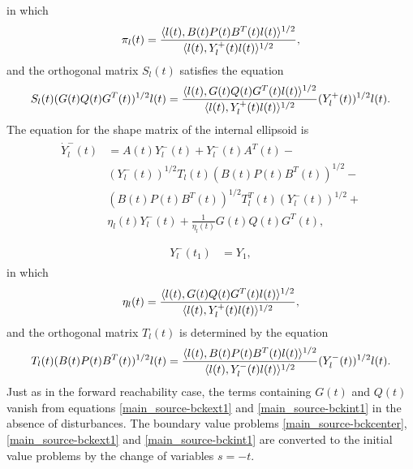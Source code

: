 \documentclass[letterpaper,10pt,english]{sphinxmanual}
\begin{document}
in which
\begin{gather}
\begin{split}\pi_l(t) = \frac{\langle l(t),
B(t)P(t)B^T(t)l(t)\rangle^{1/2}}{\langle l(t),
Y^+_l(t)l(t)\rangle^{1/2}},\end{split}\notag
\end{gather}
and the orthogonal matrix $S_l(t)$ satisfies the equation
\begin{gather}
\begin{split}S_l(t)(G(t)Q(t)G^T(t))^{1/2}l(t) = \frac{\langle l(t),
G(t)Q(t)G^T(t)l(t)\rangle^{1/2}}{\langle l(t),
Y_l^+(t)l(t)\rangle^{1/2}}(Y_l^{+}(t))^{1/2}l(t).\end{split}\notag
\end{gather}
The equation for the shape matrix of the internal ellipsoid is
\label{main_source:equation-bckint1}\begin{gather}
\begin{split}\dot{Y}^-_l(t) & =  A(t)Y^-_l(t) + Y^-_l(t)A^T(t) -\nonumber \\
& (Y_l^{-}(t))^{1/2}T_l(t)(B(t)P(t)B^T(t))^{1/2} -\nonumber \\
& (B(t)P(t)B^T(t))^{1/2}T_l^T(t)(Y_l^{-}(t))^{1/2} +\nonumber \\
& \eta_l(t)Y^-_l(t) + \frac{1}{\eta_l(t)}G(t)Q(t)G^T(t),\\\end{split}\label{main_source-bckint1}
\end{gather}\label{main_source:equation-bckint2}\begin{gather}
\begin{split}Y^-_l(t_1) & = Y_1,\end{split}\label{main_source-bckint2}
\end{gather}
in which
\begin{gather}
\begin{split}\eta_l(t) = \frac{\langle l(t),
G(t)Q(t)G^T(t)l(t)\rangle^{1/2}}{\langle l(t),
Y^+_l(t)l(t)\rangle^{1/2}},\end{split}\notag
\end{gather}
and the orthogonal matrix $T_l(t)$ is determined by the equation
\begin{gather}
\begin{split}T_l(t)(B(t)P(t)B^T(t))^{1/2}l(t) = \frac{\langle l(t),
B(t)P(t)B^T(t)l(t)\rangle^{1/2}}{\langle l(t),
Y_l^-(t)l(t)\rangle^{1/2}}(Y_l^{-}(t))^{1/2}l(t).\end{split}\notag
\end{gather}
Just as in the forward reachability case, the terms containing
$G(t)$ and $Q(t)$ vanish from equations \eqref{main_source-bckext1} and
\eqref{main_source-bckint1} in the absence of disturbances. The boundary value problems
\eqref{main_source-bckcenter}, \eqref{main_source-bckext1} and \eqref{main_source-bckint1} are converted to the initial
value problems by the change of variables $s = -t$.
\end{document}

